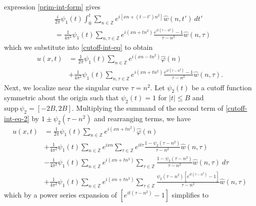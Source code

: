 \documentclass[12pt,reqno]{amsart}
\newcommand{\wh}{\widehat}
\newcommand{\zz}{\mathbb{Z}}
\newcommand{\vp}{\varphi}
\theoremstyle{plain}  %
\begin{document}
expression \eqref{prim-int-form} gives
%
%
%
\begin{equation*}
	\begin{split}
		& \frac{i }{2 \pi} \psi_1(t) \int_0^t \sum_{n \in \zz} 
		e^{i\left[ xn + (t - t')n^2 \right]} \wh{w}(n, t') \ dt'
		\\
		& = \frac{1}{4 \pi^2} \psi_1(t) \sum_{n, \tau \in \zz} 
		e^{i(xn + tn^2)} \frac{e^{it(\tau - n^2)}- 1}{\tau - n^2} 
		\wh{w}(n, \tau)  
		\end{split}
\end{equation*}
%
%
which we substitute
into \eqref{cutoff-int-eq} to obtain
%
%
\begin{equation}
	\begin{split}
		\label{cutoff-int-eq-2}
		u(x, t)
		& = \frac{1}{2 \pi} \psi_1(t) \sum_{n \in \zz} e^{i(xn - tn^{2  
		})} \widehat{\vp}(n) 
		\\
		& + \frac{1}{4 \pi^2} \psi_1(t) \sum_{n, \tau \in \zz} 
		e^{i(xn + tn^2)} \frac{e^{it(\tau - n^2)}- 1}{\tau - n^2} \wh{w}(n, 
		\tau). 
	\end{split}
\end{equation}
%
%
Next, we localize near the singular curve $\tau = n^2$. Let $\psi_2(t)$ be a cutoff function symmetric about the origin such that 
$\psi_2(t) = 1$ for $|t| \le B$ and $\text{supp} \, \psi_2 = 
[-2B, 2 B]$.
Multiplying the summand of the second term of \eqref{cutoff-int-eq-2} by $1 \pm \psi_2(\tau - n^2)$ and rearranging 
terms, we have
%
%
\begin{equation*}
	\begin{split}
		 u(x, t)
		& = \frac{1}{2 \pi} \psi_1(t) \sum_{n \in \zz} e^{i(xn + tn^{2 
		})} \widehat{\vp}(n) 
		\\
		& + \frac{1}{4 \pi^2} \psi_1(t) \sum_{n \in \zz} e^{ixn} \sum_{\tau \in \zz} 
		e^{it \tau} \frac{ 1 - \psi_2(\tau - n^2) 
		}{\tau - n^2} \wh{w}(n, \tau) 
		\\
		& - \frac{1}{4 \pi^2} \psi_1(t) \sum_{n \in \zz} e^{i(xn + 
		tn^2)}
		\sum_{\tau \in \zz} \frac{1- \psi_2(\tau - n^2)}{\tau - n^2} \wh{w}(n, \tau) \ 
		d\tau
		\\
		& + \frac{1}{4 \pi^2} \psi_1(t) \sum_{n \in \zz}
		e^{i(xn + tn^2)}
		\sum_{\tau \in \zz} 
		\frac{\psi_2(\tau - n^2)\left[ e^{it(\tau - n^2)}-1 
		\right]}{\tau - n^2} \wh{w}(n, \tau) 
	\end{split}
\end{equation*}
%
%
which by a power series expansion of $[e^{it(\tau - n^2)}-1]$ simplifies  to
%
%
\end{document}
